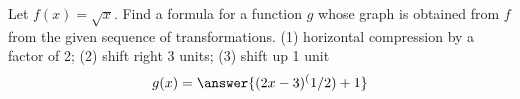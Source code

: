 \documentclass{ximera}
\begin{document}
\begin{exercise}
Let $f(x) = \sqrt{x}$. Find a formula for a function $g$ whose graph is obtained from $f$ from the given
sequence of transformations.
(1) horizontal compression by a factor of 2; (2) shift right 3 units; (3) shift up 1 unit
\[
g(x)=\answer{(2x-3)^(1/2)+1}
\]
\end{exercise}
\end{document}

